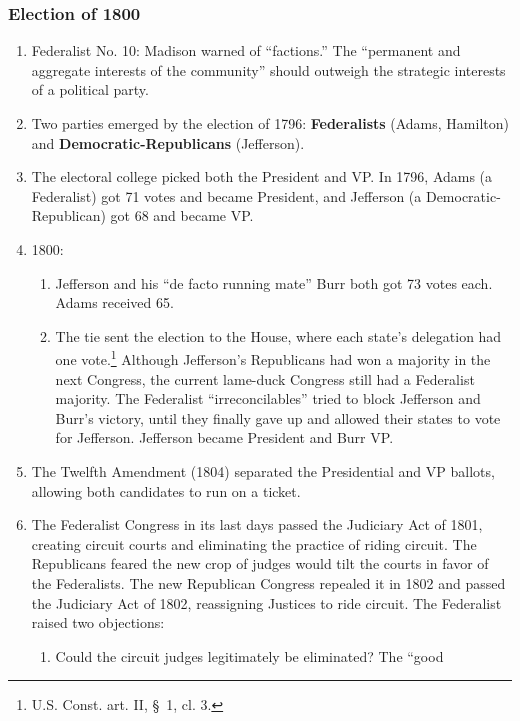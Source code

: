\subsubsection{Election of 1800}

\begin{enumerate}
    \item Federalist No. 10: Madison warned of ``factions.'' The ``permanent 
    and aggregate interests of the community'' should outweigh the strategic 
    interests of a political party.
    \item Two parties emerged by the election of 1796: \textbf{Federalists} 
    (Adams, Hamilton) and \textbf{Democratic-Republicans} (Jefferson).
    \item The electoral college picked both the President and VP. In 1796, 
    Adams (a Federalist) got 71 votes and became President, and Jefferson (a 
    Democratic-Republican) got 68 and became VP.
    \item 1800:
    \begin{enumerate}
        \item Jefferson and his ``de facto running mate'' Burr both got 73 
        votes each. Adams received 65.
        \item The tie sent the election to the House, where each state's 
        delegation had one vote.\footnote{U.S. Const. art. II, \S\ 1, cl. 3.} 
        Although Jefferson's Republicans had won a majority in the next 
        Congress, the current lame-duck Congress still had a Federalist 
        majority. The Federalist ``irreconcilables'' tried to block Jefferson 
        and Burr's victory, until they finally gave up and allowed their 
        states to vote for Jefferson. Jefferson became President and Burr VP.
    \end{enumerate}
    \item The Twelfth Amendment (1804) separated the Presidential and VP 
    ballots, allowing both candidates to run on a ticket.
    \item The Federalist Congress in its last days passed the Judiciary Act of 
    1801, creating circuit courts and eliminating the practice of riding 
    circuit. The Republicans feared the new crop of judges would tilt the 
    courts in favor of the Federalists. The new Republican Congress repealed 
    it in 1802 and passed the Judiciary Act of 1802, reassigning Justices to 
    ride circuit. The Federalist raised two 
    objections:
    \begin{enumerate}
        \item Could the circuit judges legitimately be eliminated? The ``good 

\end{enumerate}
\end{enumerate}
